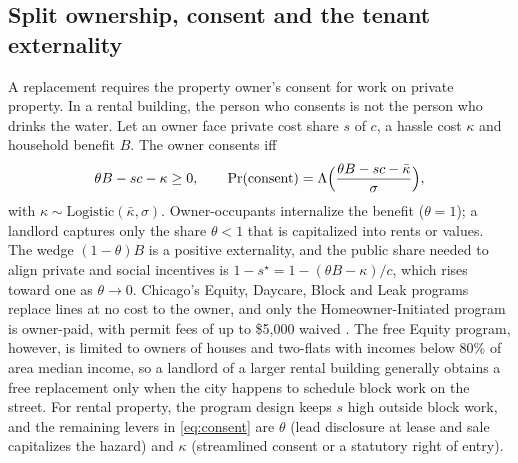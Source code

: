 \documentclass[11pt]{article}
\begin{document}
\subsection{Split ownership, consent and the tenant externality}\label{sec:consent}
A replacement requires the property owner's consent for work on private property. In a rental
building, the person who consents is not the person who drinks the water. Let an owner face private
cost share $s$ of $c$, a hassle cost $\kappa$ and household benefit $B$. The owner consents iff
\begin{equation}
\theta B-sc-\kappa\geq0,\qquad
\Pr(\text{consent})=\Lambda\Bigl(\frac{\theta B-sc-\bar\kappa}{\sigma}\Bigr),\label{eq:consent}
\end{equation}
with $\kappa\sim\mathrm{Logistic}(\bar\kappa,\sigma)$. Owner-occupants internalize the benefit
($\theta=1$); a landlord captures only the share $\theta<1$ that is capitalized into rents or
values. The wedge $(1-\theta)B$ is a positive externality, and the public share needed to align
private and social incentives is $1-s^\star=1-(\theta B-\kappa)/c$, which rises toward one as
$\theta\to0$. Chicago's Equity, Daycare, Block and Leak programs replace lines at no cost to the
owner, and only the Homeowner-Initiated program is owner-paid, with permit fees of up to \$5,000
waived \citep{cdwm2024ccr}. The free Equity program, however, is limited to owners of houses and
two-flats with incomes below 80\% of area median income, so a landlord of a larger rental building
generally obtains a free replacement only when the city happens to schedule block work on the
street. For rental property, the program design keeps $s$ high outside block work, and the remaining
levers in \cref{eq:consent} are $\theta$ (lead disclosure at lease and sale capitalizes the hazard)
and $\kappa$ (streamlined consent or a statutory right of entry).
\end{document}
